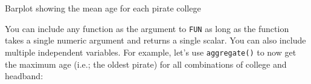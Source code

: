\documentclass{tufte-book}\usepackage[]{graphicx}\usepackage[]{color}
\makeatletter
\def\maxwidth{ %
  \ifdim\Gin@nat@width>\linewidth
    \linewidth
  \else
    \Gin@nat@width
  \fi
}
\newcommand{\hlopt}[1]{\textcolor[rgb]{0,0,0}{#1}}%
\newcommand{\hlstd}[1]{\textcolor[rgb]{0.345,0.345,0.345}{#1}}%
\newcommand{\hlkwb}[1]{\textcolor[rgb]{0.69,0.353,0.396}{#1}}%
\newcommand{\hlkwc}[1]{\textcolor[rgb]{0.333,0.667,0.333}{#1}}%
\newcommand{\hlkwd}[1]{\textcolor[rgb]{0.737,0.353,0.396}{\textbf{#1}}}%
\newenvironment{kframe}{%
 \def\at@end@of@kframe{}%
 \ifinner\ifhmode%
  \def\at@end@of@kframe{\end{minipage}}%
  \begin{minipage}{\columnwidth}%
 \fi\fi%
 \def\FrameCommand##1{\hskip\@totalleftmargin \hskip-\fboxsep
 \colorbox{shadecolor}{##1}\hskip-\fboxsep
     \hskip-\linewidth \hskip-\@totalleftmargin \hskip\columnwidth}%
 \MakeFramed {\advance\hsize-\width
   \@totalleftmargin\z@ \linewidth\hsize
   \@setminipage}}%
 {\par\unskip\endMakeFramed%
 \at@end@of@kframe}
\newenvironment{knitrout}{}{} %
\makeatother
\begin{document}
\begin{marginfigure}
\caption{Barplot showing the mean age for each pirate college}
\label{fig:barplot}
\end{marginfigure}

You can include any function as the argument to \texttt{FUN} as long as the function takes a single numeric argument and returns a single scalar. You can also include multiple independent variables. For example, let's use \texttt{aggregate()} to now get the maximum age (i.e.; the oldest pirate) for all combinations of college and headband:
\end{document}
